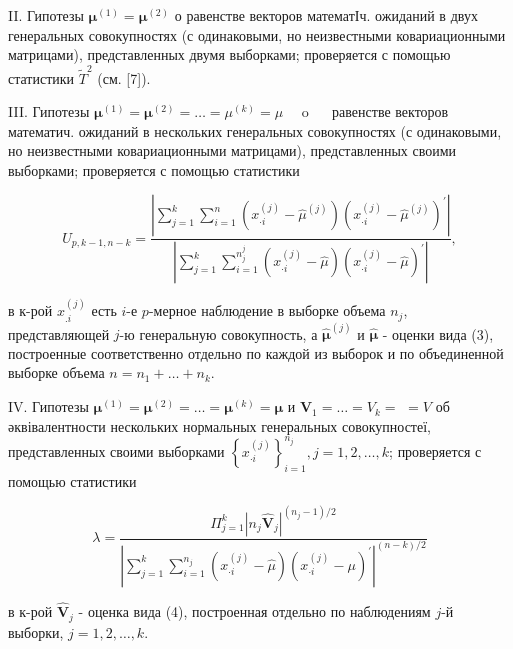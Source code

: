 \documentclass[10pt]{article}
\begin{document}
II. Гипотезы $\boldsymbol{\mu}^{(1)}=\boldsymbol{\mu}^{(2)}$ о равенстве векторов математІч. ожиданий в двух генеральных совокупностях (с одинаковыми, но неизвестными ковариационными матрицами), представленных двумя выборками; проверяется с помощью статистики $\tilde{T}^{2}$ (см. [7]).



III. Гипотезы $\boldsymbol{\mu}^{(1)}=\boldsymbol{\mu}^{(2)}=\ldots=\mu^{(k)}=\mu \quad$ o $\quad$ равенстве векторов математич. ожиданий в нескольких генеральных совокупностях (с одинаковыми, но неизвестными ковариационными матрицами), представленных своими выборками; проверяется с помощью статистики



\[

U_{p, k-1, n-k}=\frac{\left|\sum_{j=1}^{k} \sum_{i=1}^{n}\left(x_{\cdot i}^{(j)}-\hat{\mu}^{(j)}\right)\left(x_{\cdot i}^{(j)}-\hat{\mu}^{(j)}\right)^{\prime}\right|}{\left|\sum_{j=1}^{k} \sum_{i=1}^{n_{j}^{j}}\left(x_{\cdot i}^{(j)}-\hat{\mu}\right)\left(x_{\cdot i}^{(j)}-\hat{\mu}\right)^{\prime}\right|},

\]



в к-рой $x_{. i}^{(j)}$ есть $i$-е $p$-мерное наблюдение в выборке объема $n_{j}$, представляющей $j$-ю генеральную совокупность, а $\hat{\boldsymbol{\mu}}^{(j)}$ и $\hat{\boldsymbol{\mu}}$ - оценки вида (3), построенные соответственно отдельно по каждой из выборок и по объединенной выборке объема $n=n_{1}+\ldots+n_{k}$.



IV. Гипотезы $\boldsymbol{\mu}^{(1)}=\boldsymbol{\mu}^{(2)}=\ldots=\boldsymbol{\mu}^{(k)}=\boldsymbol{\mu}$ и $\boldsymbol{V}_{1}=\ldots=V_{k}=$ $=V$ об әквівалентности нескольких нормальных генеральных совокупностеї, представленных своими выборками $\left\{x_{\cdot i}^{(j)}\right\}_{i=1}^{n_{j}}, j=1,2, \ldots, k$; проверяется с помощью статистики



\[

\lambda=\frac{\Pi_{j=1}^{k}\left|n_{j} \hat{\boldsymbol{V}}_{j}\right|^{\left(n_{j}-1\right) / 2}}{\left|\sum_{j=1}^{k} \sum_{i=1}^{n_{j}}\left(x_{\cdot i}^{(j)}-\hat{\mu}\right)\left(x_{\cdot i}^{(j)}-\mu\right)^{\prime}\right|^{(n-k) / 2}}

\]



в к-рой $\hat{\boldsymbol{V}}_{j}$ - оценка вида (4), построенная отдельно по наблюдениям $j$-й выборки, $j=1,2, \ldots, k$.
\end{document}
